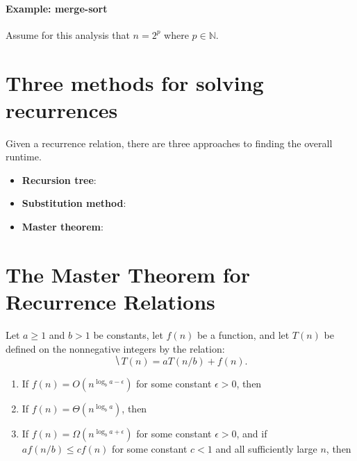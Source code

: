 \documentclass[11  pt]{article}
\begin{document}
\paragraph{Example: merge-sort}
Assume for this analysis that $n = 2^p$ where $p \in \mathbb{N}$. \\


\newpage


\section{Three methods for solving recurrences}
Given a recurrence relation, there are three approaches to finding the overall runtime.
\begin{itemize}
\item \textbf{Recursion tree}: 
\item \textbf{Substitution method}: 
\item \textbf{Master theorem}: 
\end{itemize}

\newpage
\section{The Master Theorem for Recurrence Relations}
\begin{theorem}
	Let $a \geq 1$ and $b > 1$ be constants, let $f(n)$ be a function, and let $T(n)$ be defined on the nonnegative integers by the relation:
	\begin{equation*}
		\hide{T(n) = aT(n/b) + f(n).}
	\end{equation*}
	\begin{enumerate}
		\itemsep = 4em
		\item If $f(n) = O(n^{\log_b a - \epsilon})$ for some constant $\epsilon > 0$, then 
		\item If $f(n) = \Theta(n^{\log_b a})$, then 
		\item If $f(n) = \Omega(n^{\log_b a + \epsilon})$ for some constant $\epsilon > 0$, and if $a f(n/b) \leq c f(n)$ for some constant $c < 1$ and all sufficiently large $n$, then 
	\end{enumerate}
\end{theorem}
\end{document}
